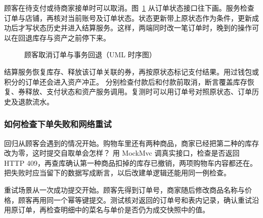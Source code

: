 顾客在待支付或待商家接单时可以取消。图~\ref{fig:def-cancel-sequence-uml} 从订单状态接口往下画。服务检查订单与店铺，再核对当前账号及订单状态。状态更新带上原状态作为条件，更新成功后才写状态历史并进入结算服务。这样，两端同时改一笔订单时，晚到的操作可以在回退库存与资产之前停下来。

\begin{figure}[!htbp]
  \centering
  
  \caption{顾客取消订单与事务回退（UML 时序图）}\label{fig:def-cancel-sequence-uml}
\end{figure}

结算服务恢复库存、释放该订单关联的券，再按原状态标记支付结果。用过钱包或积分的订单还会进入资产冲正。 分别检查付款后和付款前取消，断言覆盖库存恢复、券释放、支付状态和资产服务调用。复测时可以用订单号对照原状态、订单历史及退款流水。

\subsubsection{如何检查下单失败和网络重试}

回归从顾客会遇到的情况开始。购物车里还有两种商品，商家已经把第二种的库存改为零，这时提交自取单会怎样？ 用 MockMvc 调真实接口，检查是否返回 HTTP 409，再查库确认第一种商品扣掉的库存已撤销，两项购物车内容都还在。把失败时应当留下的数据写成断言，以后改建单逻辑还能用同一例检查。

重试场景从一次成功提交开始。顾客先得到订单号，商家随后修改商品名称与价格，顾客再用同一个幂等键提交。测试核对返回的订单号和表内记录，确认重试沿用原订单，再检查明细中的菜名与单价是否仍为成交快照中的值。

